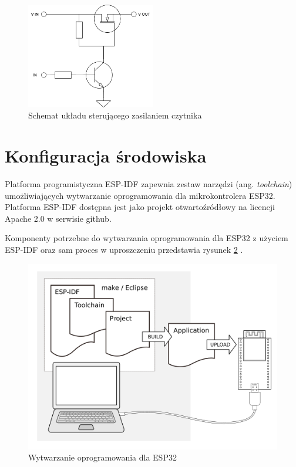             \begin{figure}[]
                \centering
                \includegraphics[width=0.5\textwidth]{chapters/images/rfid_power_relay.png}
                \caption{Schemat układu sterującego zasilaniem czytnika}
                \label{fig:rfid_power_relay}
            \end{figure}



    \section{Konfiguracja środowiska}

        Platforma programistyczna ESP-IDF zapewnia zestaw narzędzi (ang. \textit{toolchain}) umożliwiających wytwarzanie oprogramowania dla mikrokontrolera ESP32. Platforma ESP-IDF dostępna jest jako projekt otwartoźródłowy na licencji Apache 2.0 w serwisie github.

        Komponenty potrzebne do wytwarzania oprogramowania dla ESP32 z użyciem ESP-IDF oraz sam proces w uproszczeniu przedstawia rysunek \ref{fig:esp32_dev} \cite{esp-idf-get-started}.

        \begin{figure}[]
            \centering
            \includegraphics[width=\textwidth]{chapters/images/esp32_dev.png}
            \caption{Wytwarzanie oprogramowania dla ESP32}
            \label{fig:esp32_dev}
        \end{figure}

